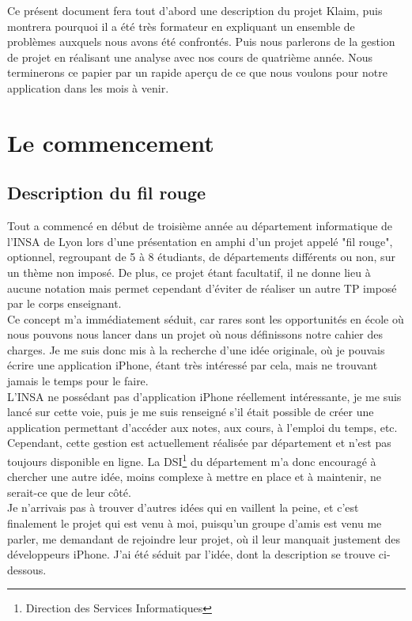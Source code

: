 \documentclass{article}
\begin{document}
Ce présent document fera tout d'abord une description du projet Klaim, puis montrera pourquoi il a été très formateur en expliquant un ensemble de problèmes auxquels nous avons été confrontés. Puis nous parlerons de la gestion de projet en réalisant une analyse avec nos cours de quatrième année. Nous terminerons ce papier par un rapide aperçu de ce que nous voulons pour notre application dans les mois à venir.


\section{Le commencement}
\subsection{Description du fil rouge}
	Tout a commencé en début de troisième année au département informatique de l'INSA de Lyon lors d'une présentation en amphi d'un projet appelé "fil rouge", optionnel, regroupant de 5 à 8 étudiants, de départements différents ou non, sur un thème non imposé. De plus, ce projet étant facultatif, il ne donne lieu à aucune notation mais permet cependant d'éviter de réaliser un autre TP imposé par le corps enseignant.\\
	
	Ce concept m’a immédiatement séduit, car rares sont les opportunités en école où nous pouvons nous lancer dans un projet où nous définissons notre cahier des charges. Je me suis donc mis à la recherche d’une idée originale, où je pouvais écrire une application iPhone, étant très intéressé par cela, mais ne trouvant jamais le temps pour le faire.\\
	
	L'INSA ne possédant pas d'application iPhone réellement intéressante, je me suis lancé sur cette voie, puis je me suis renseigné s'il était possible de créer une application permettant d'accéder aux notes, aux cours, à l'emploi du temps, etc. Cependant, cette gestion est actuellement réalisée par département et n'est pas toujours disponible en ligne. La DSI\footnote{Direction des Services Informatiques} du département m'a donc encouragé à chercher une autre idée, moins complexe à mettre en place et à maintenir, ne serait-ce que de leur côté.\\
	
	Je n'arrivais pas à trouver d'autres idées qui en vaillent la peine, et c'est finalement le projet qui est venu à moi, puisqu’un groupe d’amis est venu me parler, me demandant de rejoindre leur projet, où il leur manquait justement des développeurs iPhone. J’ai été séduit par l’idée, dont la description se trouve ci-dessous.\\
	
\end{document}

